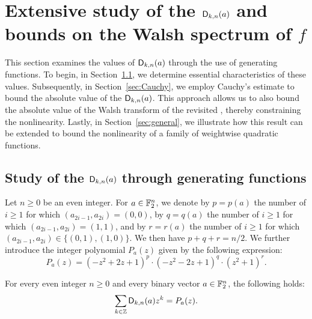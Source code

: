\documentclass{llncs}
\begin{document}
\section{Extensive study of the $\Dnka nka$ and bounds on the Walsh spectrum of $f$}\label{sec:dnk}

This section examines the values of $\Dnka nka$ through the use of generating functions. To begin, in Section~\ref{sec:genfunc}, we determine essential characteristics of these values. Subsequently, in Section~\ref{sec:Cauchy}, we employ Cauchy's estimate to bound the absolute value of the $\Dnka nka$. This approach allows us to also bound the absolute value of the Walsh transform of the revisited \hwbf{}, thereby constraining the nonlinearity. Lastly, in Section~\ref{sec:general}, we illustrate how this result can be extended to bound the nonlinearity of a family of weightwise quadratic functions.

\subsection{Study of the $\Dnka nka$ through generating functions}\label{sec:genfunc}

\begin{definition}\label{defi:P_a}
    Let $n\geq 0$ be an even integer. For $a\in\F_2^n$, we denote by $p=p(a)$ the number of $i\geq 1$ for which $(a_{2i-1},a_{2i})=(0,0)$, by $q=q(a)$ the number of $i\geq 1$ for which $(a_{2i-1},a_{2i})=(1,1)$, and by $r=r(a)$ the number of $i\geq 1$ for which $(a_{2i-1},a_{2i})\in\{(0,1),(1,0)\}$. We then have $p+q+r=n/2$. We further introduce the integer polynomial $P_a(z)$ given by the following expression:
    \[
    	P_a(z)=(-z^2+2z+1)^{p}\cdot(-z^2-2z+1)^{q}\cdot(z^2+1)^{r}.
    \]
\end{definition}

\begin{proposition}\label{proposition:generating_fct}
	For every even integer $n\geq 0$ and every binary vector $a\in\F_2^n$, the following holds:
    \[
        \sum_{k\in\Z}\Dnka nka z^k= P_a(z).
    \]
\end{proposition}
\end{document}
